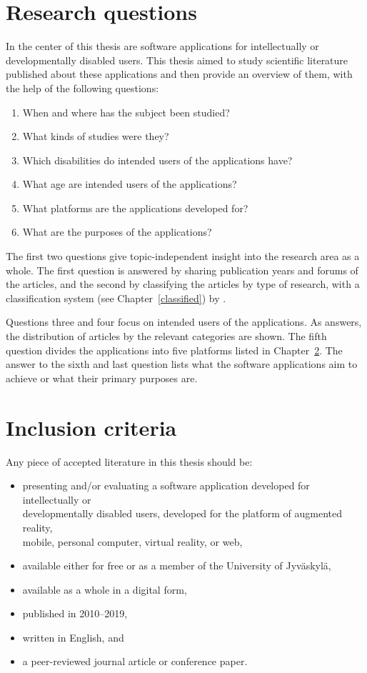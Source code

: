 \documentclass[utf8,english]{gradu3}
\begin{document}
\section{Research questions} \label{questions}

In the center of this thesis are software applications for intellectually or developmentally disabled users.
This thesis aimed to study scientific literature published about these applications and
then provide an overview of them, with the help of the following questions:

\begin{enumerate}
  \item When and where has the subject been studied?
  \item What kinds of studies were they?
  \item Which disabilities do intended users of the applications have?
  \item What age are intended users of the applications?
  \item What platforms are the applications developed for?
  \item What are the purposes of the applications?
\end{enumerate}

The first two questions give topic-independent insight into the research area as a whole.
The first question is answered by sharing publication years and forums of the articles, and
the second by classifying the articles by type of research, with a classification system (see Chapter~\ref{classified})
by \textcite{wieringa2006requirements}.

Questions three and four focus on intended users of the applications.
As answers, the distribution of articles by the relevant categories are shown.
The fifth question divides the applications into five platforms listed in Chapter~\ref{criteria}.
The answer to the sixth and last question lists what the software applications aim
to achieve or what their primary purposes are.

\section{Inclusion criteria} \label{criteria}

Any piece of accepted literature in this thesis should be:
\begin{itemize}
  \item presenting and/or evaluating a software application developed for intellectually or \\developmentally disabled users, developed for the platform of augmented reality, \\mobile, personal computer, virtual reality, or web,
  \item available either for free or as a member of the University of Jyväskylä,
  \item available as a whole in a digital form,
  \item published in 2010--2019,
  \item written in English, and
  \item a peer-reviewed journal article or conference paper.
\end{itemize}
\end{document}
